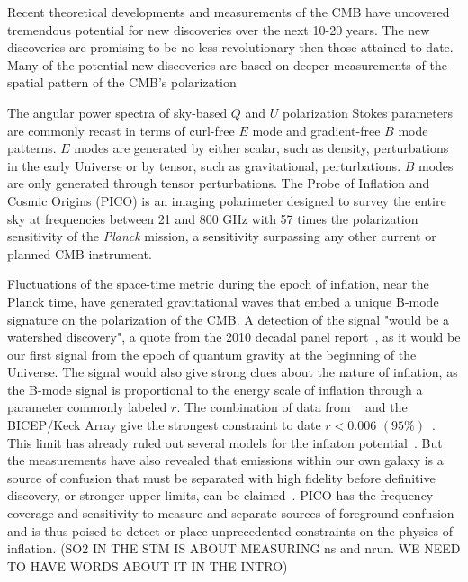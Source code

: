 \documentclass[PICOReport.tex]{subfiles}
\begin{document}

Recent theoretical developments and measurements of the \ac{CMB} 
have uncovered tremendous potential for new discoveries over the next 10-20 years. The new discoveries are promising to be 
no less revolutionary then those attained to date. Many of the potential new discoveries are based on deeper
measurements of the spatial pattern of the CMB's polarization

The angular power spectra of sky-based $Q$ and $U$ polarization Stokes parameters are commonly recast in terms
of curl-free $E$ mode and gradient-free $B$ mode patterns. $E$ modes are generated by either scalar, such as density, perturbations
in the early Universe or by tensor, such as gravitational, perturbations. $B$ modes are only generated through tensor
perturbations. The Probe of Inflation and Cosmic Origins (PICO) is an imaging polarimeter designed to survey the entire 
sky at frequencies between 21 and 800 GHz with 57 times the polarization sensitivity of the {\it Planck} mission, a sensitivity 
surpassing any other current or planned CMB instrument. 

Fluctuations of the space-time metric during the epoch of inflation, near the Planck time, have generated gravitational waves 
that embed a unique B-mode signature on the polarization of the CMB. A detection of the signal "would be a watershed discovery", 
a quote from the 2010 decadal panel report~\citep{nwnh}, as it would be our first signal from the epoch of quantum gravity 
at the beginning of the Universe. The signal would also give strong clues 
about the nature of inflation, as the B-mode signal is proportional to the energy scale of inflation through a parameter 
commonly labeled $r$. 
The combination of data from \planck~ and the BICEP/Keck Array give the strongest constraint to date 
$r<0.006\,\, (95\%)$~\citep{rlimit}.  This limit has already ruled out several 
models for the inflaton potential~\citep{planck2018inflation}. 
But the measurements have also 
revealed that emissions within our own galaxy is a source of confusion that must be separated with high fidelity 
before definitive discovery, or stronger upper limits, can be claimed~\citep{whichplanck}. 
PICO has the frequency coverage and sensitivity to measure and separate sources of foreground confusion and is thus 
poised to detect or place unprecedented constraints on the physics of inflation. 
(SO2 IN THE STM IS ABOUT MEASURING ns and nrun. WE NEED TO HAVE WORDS ABOUT IT IN THE INTRO)
\end{document}

